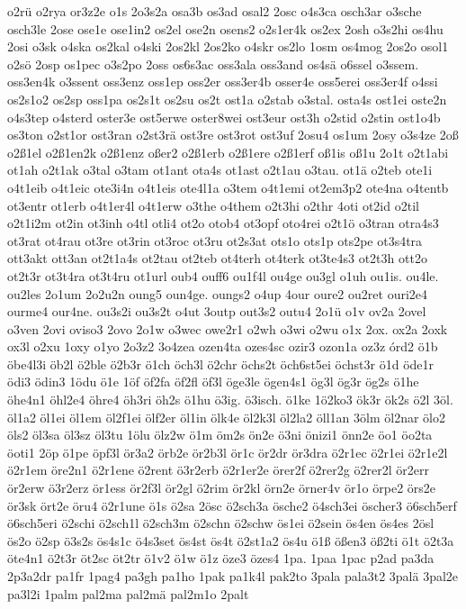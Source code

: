 {o2rü
o2rya
or3z2e
o1s
2o3s2a
osa3b
os3ad
osal2
2osc
o4s3ca
osch3ar
o3sche
osch3le
2ose
ose1e
ose1in2
os2el
ose2n
osens2
o2s1er4k
os2ex
2osh
o3s2hi
os4hu
2osi
o3sk
o4ska
os2kal
o4ski
2os2kl
2os2ko
o4skr
os2lo
1osm
os4mog
2os2o
osol1
o2sö
2osp
os1pec
o3s2po
2oss
os6s3ac
oss3ala
oss3and
os4sä
o6ssel
o3ssem.
oss3en4k
o3ssent
oss3enz
oss1ep
oss2er
oss3er4b
osser4e
oss5erei
oss3er4f
o4ssi
os2s1o2
os2sp
oss1pa
os2s1t
os2su
os2t
ost1a
o2stab
o3stal.
osta4s
ost1ei
oste2n
o4s3tep
o4sterd
oster3e
ost5erwe
oster8wei
ost3eur
ost3h
o2stid
o2stin
ost1o4b
os3ton
o2st1or
ost3ran
o2st3rä
ost3re
ost3rot
ost3uf
2osu4
os1um
2osy
o3s4ze
2oß
o2ß1el
o2ß1en2k
o2ß1enz
oßer2
o2ß1erb
o2ß1ere
o2ß1erf
oß1is
oß1u
2o1t
o2t1abi
ot1ah
o2t1ak
o3tal
o3tam
ot1ant
ota4s
ot1ast
o2t1au
o3tau.
ot1ä
o2teb
ote1i
o4t1eib
o4t1eic
ote3i4n
o4t1eis
ote4l1a
o3tem
o4t1emi
ot2em3p2
ote4na
o4tentb
ot3entr
ot1erb
o4t1er4l
o4t1erw
o3the
o4them
o2t3hi
o2thr
4oti
ot2id
o2til
o2t1i2m
ot2in
ot3inh
o4tl
otli4
ot2o
otob4
ot3opf
oto4rei
o2t1ö
o3tran
otra4s3
ot3rat
ot4rau
ot3re
ot3rin
ot3roc
ot3ru
ot2s3at
ots1o
ots1p
ots2pe
ot3s4tra
ott3akt
ott3an
ot2t1a4s
ot2tau
ot2teb
ot4terh
ot4terk
ot3te4s3
ot2t3h
ott2o
ot2t3r
ot3t4ra
ot3t4ru
ot1url
oub4
ouff6
ou1f4l
ou4ge
ou3gl
o1uh
ou1is.
ou4le.
ou2les
2o1um
2o2u2n
oung5
oun4ge.
oungs2
o4up
4our
oure2
ou2ret
ouri2e4
ourme4
our4ne.
ou3s2i
ou3s2t
o4ut
3outp
out3s2
outu4
2o1ü
o1v
ov2a
2ovel
o3ven
2ovi
oviso3
2ovo
2o1w
o3wec
owe2r1
o2wh
o3wi
o2wu
o1x
2ox.
ox2a
2oxk
ox3l
o2xu
1oxy
o1yo
2o3z2
3o4zea
ozen4ta
ozes4sc
ozir3
ozon1a
oz3z
órd2
ö1b
öbe4l3i
öb2l
ö2ble
ö2b3r
ö1ch
öch3l
ö2chr
öchs2t
öch6st5ei
öchst3r
ö1d
öde1r
ödi3
ödin3
1ödu
ö1e
1öf
öf2fa
öf2fl
öf3l
öge3le
ögen4s1
ög3l
ög3r
ög2s
ö1he
öhe4n1
öhl2e4
öhre4
öh3ri
öh2s
ö1hu
ö3ig.
ö3isch.
ö1ke
1ö2ko3
ök3r
ök2s
ö2l
3öl.
öl1a2
öl1ei
öl1em
öl2f1ei
ölf2er
öl1in
ölk4e
öl2k3l
öl2la2
öll1an
3ölm
öl2nar
ölo2
öls2
öl3sa
öl3sz
öl3tu
1ölu
ölz2w
ö1m
öm2s
ön2e
ö3ni
önizi1
önn2e
öo1
öo2ta
öoti1
2öp
ö1pe
öpf3l
ör3a2
örb2e
ör2b3l
ör1c
ör2dr
ör3dra
ö2r1ec
ö2r1ei
ö2r1e2l
ö2r1em
öre2n1
ö2r1ene
ö2rent
ö3r2erb
ö2r1er2e
örer2f
ö2rer2g
ö2rer2l
ör2err
ör2erw
ö3r2erz
ör1ess
ör2f3l
ör2gl
ö2rim
ör2kl
örn2e
örner4v
ör1o
örpe2
örs2e
ör3sk
ört2e
öru4
ö2r1une
ö1s
ö2sa
2ösc
ö2sch3a
ösche2
ö4sch3ei
öscher3
ö6sch5erf
ö6sch5eri
ö2schi
ö2sch1l
ö2sch3m
ö2schn
ö2schw
ös1ei
ö2sein
ös4en
ös4es
2ösl
ös2o
ö2sp
ö3s2s
ös4s1c
ö4s3set
ös4st
ös4t
ö2st1a2
ös4u
ö1ß
ößen3
öß2ti
ö1t
ö2t3a
öte4n1
ö2t3r
öt2sc
öt2tr
ö1v2
ö1w
ö1z
öze3
özes4
1pa.
1paa
1pac
p2ad
pa3da
2p3a2dr
pa1fr
1pag4
pa3gh
pa1ho
1pak
pa1k4l
pak2to
3pala
pala3t2
3palä
3pal2e
pa3l2i
1palm
pal2ma
pal2mä
pal2m1o
2palt
}
